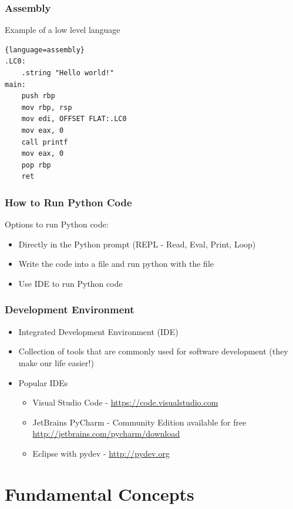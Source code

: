 \documentclass[10pt, a4paper]{beamer} %
\begin{document}
\begin{frame}[fragile]\frametitle{Assembly}
    Example of a low level language
\begin{lstlisting}{language=assembly}
.LC0:
    .string "Hello world!"
main:
    push rbp
    mov rbp, rsp
    mov edi, OFFSET FLAT:.LC0
    mov eax, 0
    call printf
    mov eax, 0
    pop rbp
    ret
\end{lstlisting}

\end{frame}

\begin{frame}[fragile,c]\frametitle{How to Run Python Code}

\begin{block}{Options to run Python code:}
\begin{itemize}
    \item Directly in the Python prompt (REPL - Read, Eval, Print, Loop)
    \item Write the code into a file and run python with the file
    \item Use IDE to run Python code
\end{itemize}
\end{block}
    
\end{frame}

\begin{frame}[c]\frametitle{Development Environment}

\begin{itemize}
    \item Integrated Development Environment (IDE)
    \item Collection of tools that are commonly used for software development (they make our life easier!)
    \item Popular IDEs
    \begin{itemize}
        \item Visual Studio Code - \url{https://code.visualstudio.com}
        \item JetBrains PyCharm - Community Edition available for free \url{http://jetbrains.com/pycharm/download}
        \item Eclipse with pydev - \url{http://pydev.org}
    \end{itemize}
\end{itemize}
\end{frame}


\section{Fundamental Concepts} %
\label{sec:fundamental_concepts}
\end{document}
